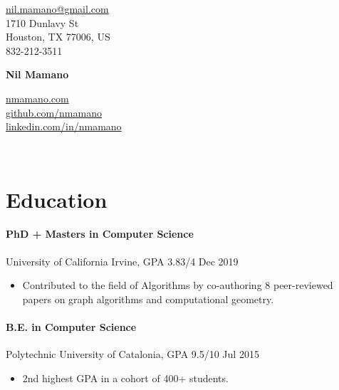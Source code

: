 \documentclass[letterpaper,10pt,oneside]{article}
\begin{document}
{\raggedleft

\begin{minipage}[c]{0.28\textwidth}
	\begin{flushleft}
	\href{mailto:nil.mamano@gmail.com}{nil.mamano@gmail.com}\\
	1710 Dunlavy St\\
	Houston, TX 77006, US\\
	832-212-3511
	\end{flushleft}
\end{minipage}\hfill
\begin{minipage}[c]{0.3\textwidth}
	\begin{center}
		\Huge{\textbf{Nil Mamano}}
	\end{center}
\end{minipage}\hfill
\begin{minipage}[c]{0.3\textwidth}
	\begin{flushright}
	\href{http://www.nmamano.com}{nmamano.com} \\
	\href{http://www.github.com/nmamano}{github.com/nmamano} \\
	\href{http://www.linkedin.com/in/nmamano}{linkedin.com/in/nmamano}
	\end{flushright}
\end{minipage}\\
\vspace{5px}
\hrulefill
}

\section*{Education}
\paragraph*{PhD + Masters in Computer Science} University of California Irvine, GPA 3.83/4 \hfill Dec 2019
\begin{itemize}[leftmargin=15px]
	\item Contributed to the field of Algorithms by co-authoring 8 peer-reviewed papers on graph algorithms and computational geometry.  	
\end{itemize}
\vspace*{-10px}
\paragraph*{B.E. in Computer Science} Polytechnic University of Catalonia, GPA 9.5/10 \hfill Jul 2015
\begin{itemize}[leftmargin=15px]
	\item 2nd highest GPA in a cohort of 400+ students.
\end{itemize}
\end{document}
